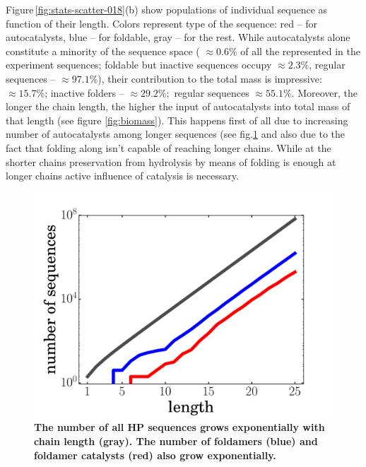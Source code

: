 \documentclass[journal=jacsat,manuscript=article,layout=twocolumn]{achemso}
\begin{document}
Figure\,\ref{fig:stats-scatter-018}(b) show populations of individual sequence as function of their 
length. Colors represent type of the sequence: red -- for autocatalysts, blue -- for foldable, gray 
-- for the rest. While autocatalysts alone constitute a minority of the sequence space ( $\approx 
0.6\%$ 
of all the represented in the experiment sequences; foldable but inactive sequences occupy $\approx 
2.3\%$, regular sequences -- $\approx97.1\%$), their contribution to the total mass is impressive: 
$\approx 15.7\%$; inactive folders -- $\approx 29.2\%;$ regular sequences $\approx 55.1\%$. 
Moreover, the longer the chain length, the higher the input of autocatalysts into total mass of 
that length (see figure \ref{fig:biomass}). This happens first of all due to increasing number of 
autocatalysts among longer sequences (see fig.\ref{fig:hp-statistics} and also due to the fact that 
folding along isn't capable of reaching longer chains. While at the shorter chains preservation 
from hydrolysis by means of folding is enough at longer chains active influence of catalysis is 
necessary.
\begin{figure}[hbt!]
  \centering
  \includegraphics[width=\columnwidth]{pictures/hp-statistics.pdf} 
  \caption{\footnotesize{\textbf{The number of all HP sequences grows exponentially with chain 
length (gray).  The number of foldamers (blue) and foldamer catalysts (red) also grow 
exponentially.}}}
  \label{fig:hp-statistics}
\end{figure}
\end{document}
